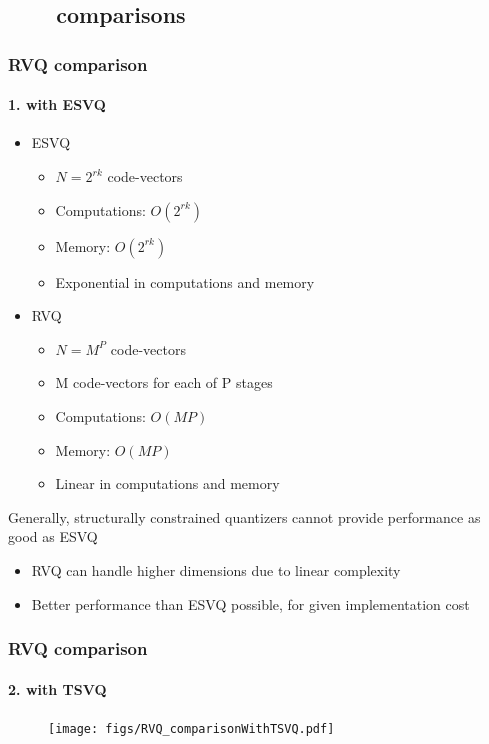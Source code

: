 \subsection{\ \ \ \ comparisons}
\begin{frame}
\frametitle{RVQ comparison}\logoCSIPCPL\mypagenum
\framesubtitle{1. with ESVQ}
	\begin{itemize}
		\item ESVQ
			\begin{itemize}
				\item $N=2^{rk}$ code-vectors
				\item Computations: $O(2^{rk})$
				\item Memory: $O(2^{rk})$
				\item Exponential in computations and memory
			\end{itemize}
		\item RVQ
			\begin{itemize}
				\item $N={M^P}$ code-vectors
				\item M code-vectors for each of P stages
				\item Computations: $O(MP)$
				\item Memory: $O(MP)$
				\item Linear in computations and memory
			\end{itemize}
	\end{itemize}
	Generally, structurally constrained quantizers cannot provide performance as good as ESVQ
	\begin{itemize}
		\item RVQ can handle higher dimensions due to linear complexity
		\item Better performance than ESVQ possible, for given implementation cost
	\end{itemize}	
\end{frame}


\begin{frame}[plain]
\frametitle{RVQ comparison}
\framesubtitle{2. with TSVQ}
\logoCSIPCPL\mypagenum
	\begin{changemargin}{-1.3in}{0in}
		\begin{figure}				
			\texttt{[image: figs/RVQ\_comparisonWithTSVQ.pdf]}
		\end{figure}
	\end{changemargin}
\end{frame}



